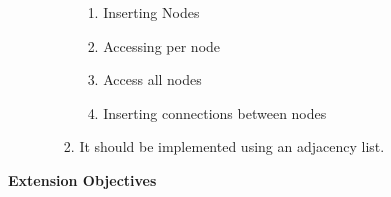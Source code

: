 \begin{FlushLeft}
\begin{enumerate}
\begin{enumerate}
\begin{enumerate}
                    \begin{enumerate}
                        \item Inserting Nodes
                        \item Accessing per node
                        \item Access all nodes 
                        \item Inserting connections between nodes
                    \end{enumerate}
                    \item It should be implemented using an adjacency list.
                \end{enumerate}
            \end{enumerate}
            \bk
        \end{enumerate}  
        \vspace{1cm}    
        \centerline{\large\textbf{Extension Objectives}}
        \vspace{1cm}


\end{FlushLeft}
